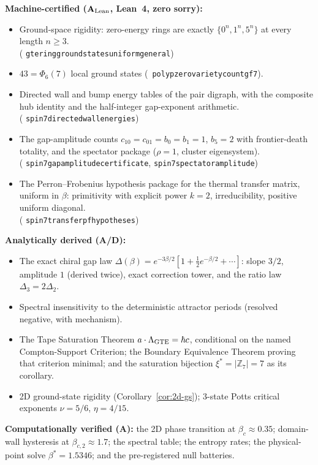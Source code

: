 \documentclass[11pt]{article}
\theoremstyle{remark}
\newcommand{\lean}[1]{%
  \penalty-100
  \begingroup\def\_{\textunderscore\allowbreak}\texttt{#1}\endgroup}
\newcommand{\CatA}{\textbf{A}}
\newcommand{\CatAL}{\ensuremath{\textbf{A}_{\rm Lean}}}
\newcommand{\CatAD}{\textbf{A/D}}
\begin{document}
\begin{tcolorbox}[
  colback=orange!8,colframe=orange!60!black,title=What This Paper Establishes,
  fonttitle=\bfseries,breakable]
\small
\textbf{Machine-certified (\CatAL{}, Lean~4, zero sorry):}
\begin{itemize}[leftmargin=1.8em,itemsep=2pt,topsep=2pt]
  \item Ground-space rigidity: zero-energy rings are exactly
        $\{0^n, 1^n, 5^n\}$ at every length $n \ge 3$.\\
        (\lean{gte\_ring\_ground\_states\_uniform\_general})
  \item $43 = \Phi_6(7)$ local ground states
        \mbox{(\lean{poly\_p\_zero\_variety\_count\_gf7})}.
  \item Directed wall and bump energy tables of the pair digraph, with the
        composite hub identity and the half-integer gap-exponent arithmetic.\\
        (\lean{spin7\_directed\_wall\_energies})
  \item The gap-amplitude counts $c_{10} = c_{01} = b_0 = b_1 = 1$, $b_5 = 2$
        with frontier-death totality, and the spectator package
        ($\rho = 1$, cluster eigensystem).\\
        (\lean{spin7\_gap\_amplitude\_certificate},
        \lean{spin7\_spectator\_amplitude})
  \item The Perron--Frobenius hypothesis package for the thermal transfer
        matrix, uniform in $\beta$: primitivity with explicit power $k = 2$,
        irreducibility, positive uniform diagonal.\\
        (\lean{spin7\_transfer\_pf\_hypotheses})
\end{itemize}
\textbf{Analytically derived (\CatAD{}):}
\begin{itemize}[leftmargin=1.8em,itemsep=2pt,topsep=2pt]
  \item The exact chiral gap law $\Delta(\beta) = e^{-3\beta/2}[1 +
        \tfrac{1}{2}e^{-\beta/2} + \cdots]$: slope $3/2$, amplitude $1$
        (derived twice), exact correction tower, and the ratio law
        $\Delta_3 = 2\Delta_2$.
  \item Spectral insensitivity to the deterministic attractor periods
        (resolved negative, with mechanism).
  \item The Tape Saturation Theorem $a \cdot \Lambda_{\rm GTE} = \hbar c$,
        conditional on the named Compton-Support Criterion; the Boundary
        Equivalence Theorem proving that criterion minimal; and the saturation
        bijection $\xi^* = |\mathbb{Z}_7| = 7$ as its corollary.
  \item 2D ground-state rigidity (Corollary~\ref{cor:2d-gs}); 3-state Potts
        critical exponents $\nu = 5/6$, $\eta = 4/15$.
\end{itemize}
\textbf{Computationally verified (\CatA{}):} the 2D phase transition at
$\beta_c \approx 0.35$; domain-wall hysteresis at $\beta_{c,2} \approx 1.7$;
the spectral table; the entropy rates; the physical-point solve
$\beta^* = 1.5346$; and the pre-registered null batteries.
\end{tcolorbox}
\end{document}
